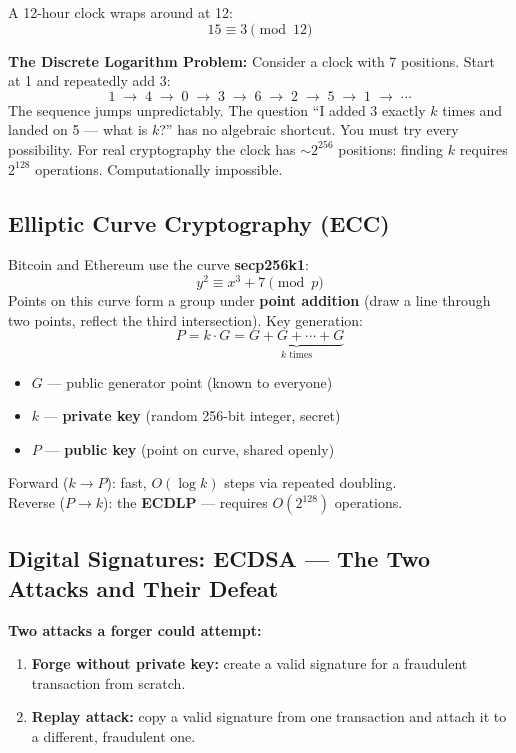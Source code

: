 \documentclass[12pt, a4paper]{article}
\begin{document}
A 12-hour clock wraps around at 12:
\[
    15 \equiv 3 \pmod{12}
\]

\textbf{The Discrete Logarithm Problem:} Consider a clock with 7 positions.
Start at 1 and repeatedly add 3:
\[
    1 \;\to\; 4 \;\to\; 0 \;\to\; 3 \;\to\; 6 \;\to\; 2 \;\to\; 5 \;\to\; 1 \;\to\; \cdots
\]
The sequence jumps unpredictably. The question ``I added 3 exactly $k$ times
and landed on 5 --- what is $k$?'' has no algebraic shortcut. You must try
every possibility. For real cryptography the clock has $\sim 2^{256}$ positions:
finding $k$ requires $2^{128}$ operations. Computationally impossible.

\subsection{Elliptic Curve Cryptography (ECC)}

Bitcoin and Ethereum use the curve \textbf{secp256k1}:
\[
    y^2 \equiv x^3 + 7 \pmod{p}
\]
Points on this curve form a group under \textbf{point addition} (draw a line
through two points, reflect the third intersection). Key generation:
\[
    P = k \cdot G = \underbrace{G + G + \cdots + G}_{k \text{ times}}
\]
\begin{itemize}
    \item $G$ --- public generator point (known to everyone)
    \item $k$ --- \textbf{private key} (random 256-bit integer, secret)
    \item $P$ --- \textbf{public key} (point on curve, shared openly)
\end{itemize}
Forward ($k \to P$): fast, $O(\log k)$ steps via repeated doubling.\\
Reverse ($P \to k$): the \textbf{ECDLP} --- requires $O(2^{128})$ operations.

\subsection{Digital Signatures: ECDSA --- The Two Attacks and Their Defeat}

\textbf{Two attacks a forger could attempt:}
\begin{enumerate}
    \item \textbf{Forge without private key:} create a valid signature for a
          fraudulent transaction from scratch.
    \item \textbf{Replay attack:} copy a valid signature from one transaction
          and attach it to a different, fraudulent one.
\end{enumerate}
\end{document}
